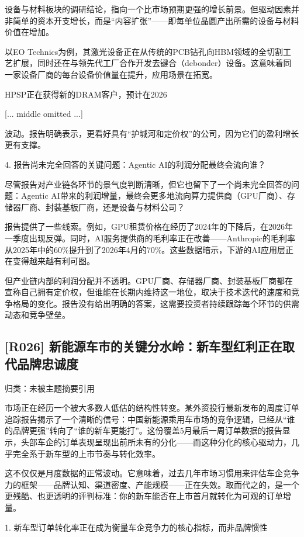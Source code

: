 \documentclass[11pt]{ctexart}
\begin{document}
设备与材料板块的调研结论，指向一个比市场预期更强的增长前景。但驱动因素并非简单的资本开支增长，而是“内容扩张”——即每单位晶圆产出所需的设备与材料价值在增加。

以EO Technics为例，其激光设备正在从传统的PCB钻孔向HBM领域的全切割工艺扩展，同时还在与领先代工厂合作开发去键合（debonder）设备。这意味着同一家设备厂商的每台设备价值量在提升，应用场景在拓宽。

HPSP正在获得新的DRAM客户，预计在2026

[... middle omitted ...]

波动。报告明确表示，更看好具有“护城河和定价权”的公司，因为它们的盈利增长更有支撑。

4. 报告尚未完全回答的关键问题：Agentic AI的利润分配最终会流向谁？

尽管报告对产业链各环节的景气度判断清晰，但它也留下了一个尚未完全回答的问题：Agentic AI带来的利润增量，最终会更多地流向算力提供商（GPU厂商）、存储器厂商、封装基板厂商，还是设备与材料公司？

报告提供了一些线索。例如，GPU租赁价格在经历了2024年的下降后，在2026年一季度出现反弹。同时，AI服务提供商的毛利率正在改善——Anthropic的毛利率从2025年中的60\%提升到了2026年4月的70\%。这些数据暗示，下游的AI应用层正在变得越来越有利可图。

但产业链内部的利润分配并不透明。GPU厂商、存储器厂商、封装基板厂商都在宣称自己拥有定价权，但谁能在长期内维持这一地位，取决于技术迭代的速度和竞争格局的变化。报告没有给出明确的答案，这需要投资者持续跟踪每个环节的供需动态和竞争壁垒。

\subsection{[R026] 新能源车市的关键分水岭：新车型红利正在取代品牌忠诚度}
{\small\color{refgray}归类：未被主题摘要引用}

市场正在经历一个被大多数人低估的结构性转变。某外资投行最新发布的周度订单追踪报告揭示了一个清晰的信号：中国新能源乘用车市场的竞争逻辑，已经从“谁的品牌更强”转向了“谁的新车更能打”。这份覆盖5月最后一周订单数据的报告显示，头部车企的订单表现呈现出前所未有的分化——而这种分化的核心驱动力，几乎完全系于新车型的上市节奏与转化效率。

这不仅仅是月度数据的正常波动。它意味着，过去几年市场习惯用来评估车企竞争力的框架——品牌认知、渠道密度、产能规模——正在失效。取而代之的，是一个更残酷、也更透明的评判标准：你的新车能否在上市首月就转化为可观的订单增量。

1. 新车型订单转化率正在成为衡量车企竞争力的核心指标，而非品牌惯性
\end{document}
